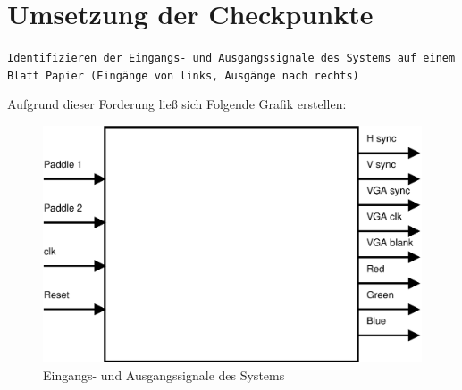 \documentclass{article}
\begin{document}
\section{Umsetzung der Checkpunkte}
\texttt{Identifizieren der Eingangs- und Ausgangssignale des Systems auf einem Blatt Papier (Eingänge von links, Ausgänge nach rechts)}

Aufgrund dieser Forderung ließ sich Folgende Grafik erstellen:
\begin{figure}[here]
	\begin{center}
		\includegraphics[width=0.65 \textwidth]{includes/TopEntity.eps}
		\caption[Eingangs- und Ausgangssignale des Systems]{Eingangs- und Ausgangssignale des Systems}
		\label{fig:Eingangs- und Ausgangssignale des Systems}
	\end{center}
\end{figure}


\newpage

\listoffigures
\printindex
\end{document}
